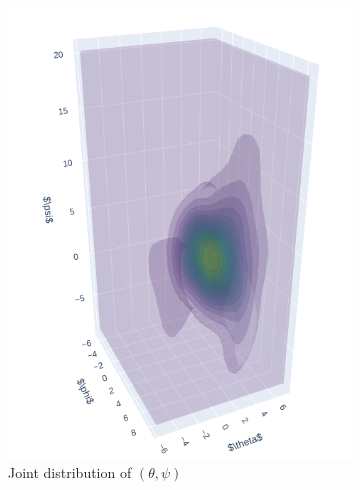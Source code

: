 \documentclass[a4paper,12pt]{article}
\theoremstyle{definition}
\begin{document}
\begin{figure}[htbp]
    \begin{subfigure}[b]{0.3\textwidth}
        \centering
        \includegraphics[width=\textwidth]{VariableSelectionPsi/joint3d_phi_theta_psi.png}
        \caption{Joint distribution of \((\theta, \psi)\)}
        \label{fig:joint3D_phi_theta_psi}
    \end{subfigure}
    \hfill
    \begin{subfigure}[b]{0.3\textwidth}
        \centering

\end{subfigure}
\end{figure}
\end{document}
